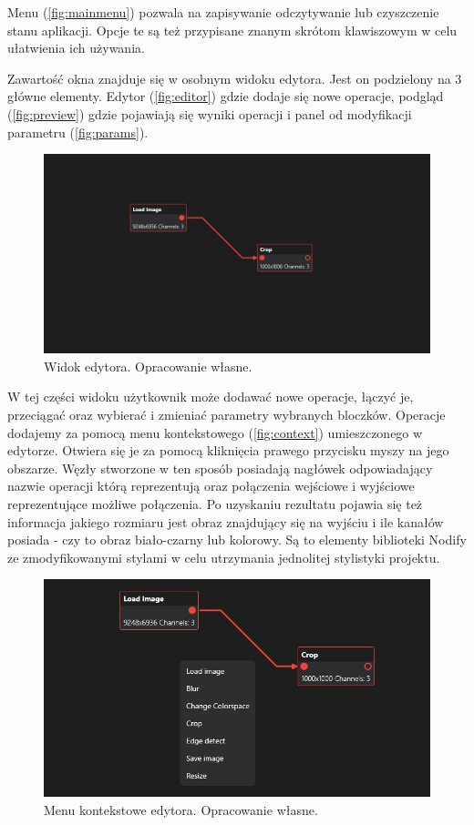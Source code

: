 Menu (\autoref{fig:mainmenu}) pozwala na zapisywanie odczytywanie lub czyszczenie stanu aplikacji. 
Opcje te są też przypisane znanym skrótom klawiszowym w celu ułatwienia ich używania.

Zawartość okna znajduje się w osobnym widoku edytora. Jest on podzielony na 3 główne elementy. Edytor (\autoref{fig:editor}) gdzie dodaje się nowe operacje, podgląd (\autoref{fig:preview}) gdzie pojawiają się wyniki operacji i panel od modyfikacji parametru (\autoref{fig:params}).

\begin{figure}[H]
    \centering
    \includegraphics[width=1\linewidth]{images/Picture15.jpg}
    \caption{Widok edytora. Opracowanie własne.}
    \label{fig:editor}
\end{figure}

W tej części widoku użytkownik może dodawać nowe operacje, łączyć je, przeciągać oraz wybierać i zmieniać parametry wybranych bloczków. 
Operacje dodajemy za pomocą menu kontekstowego (\autoref{fig:context}) umieszczonego w edytorze. 
Otwiera się je za pomocą kliknięcia prawego przycisku myszy na jego obszarze.
Węzły stworzone w ten sposób posiadają nagłówek odpowiadający nazwie operacji którą reprezentują oraz połączenia wejściowe i wyjściowe reprezentujące możliwe połączenia.
Po uzyskaniu rezultatu pojawia się też informacja jakiego rozmiaru jest obraz znajdujący się na wyjściu i ile kanałów posiada - czy to obraz biało-czarny lub kolorowy.
Są to elementy biblioteki Nodify \cite{nodify} ze zmodyfikowanymi stylami w celu utrzymania jednolitej stylistyki projektu.

\begin{figure}[H]
    \centering
    \includegraphics[width=0.6\linewidth]{images/Picture18.jpg}
    \caption{Menu kontekstowe edytora. Opracowanie własne.}
    \label{fig:context}
\end{figure}


